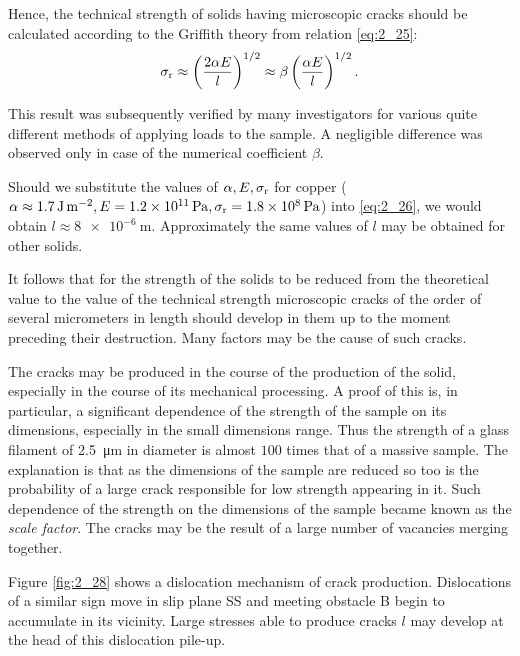 Hence, the technical strength of solids having microscopic cracks should be calculated according to the Griffith theory from relation \eqref{eq:2_25}:
\begin{equation}\label{eq:2_26}
	\sigma_{\text{r}} \approx \left(\frac{2\alpha E}{l}\right)^{1/2} \approx \beta \left(\frac{\alpha E}{l}\right)^{1/2}.
\end{equation}

\noindent
This result was subsequently verified by many investigators for various quite different methods of applying loads to the sample. A negligible difference was observed only in case of the numerical coefficient $\beta$.

Should we substitute the values of $\alpha, E, \sigma_{\text{r}}$ for copper ($\alpha\approx\SI{1.7}{\joule\per\metre\squared}, E=\SI{1.2e11}{\pascal}, \sigma_{\text{r}}=\SI{1.8e8}{\pascal}$) into \eqref{eq:2_26}, we would obtain $l\approx\SI{8e-6}{\metre}$. Approximately the same values of $l$ may be obtained for other solids.

It follows that for the strength of the solids to be reduced from the theoretical value to the value of the technical strength microscopic cracks of the order of several micrometers in length should develop in them up to the moment preceding their destruction. Many factors may be the cause of such cracks.

The cracks may be produced in the course of the production of the solid, especially in the course of its mechanical processing. A proof of this is, in particular, a significant dependence of the strength of the sample on its dimensions, especially in the small dimensions range. Thus the strength of a glass filament of \SI{2.5}{\micro\metre} in diameter is almost $100$ times that of a massive sample. The explanation is that as the dimensions of the sample are reduced so too is the probability of a large crack responsible for low strength appearing in it. Such dependence of the strength on the dimensions of the sample became known as the \textit{scale factor}. The cracks may be the result of a large number of vacancies merging together.

Figure \ref{fig:2_28} shows a dislocation mechanism of crack production. Dislocations of a similar sign move in slip plane SS and meeting obstacle B begin to accumulate in its vicinity. Large stresses able to produce cracks $l$ may develop at the head of this dislocation pile-up.

